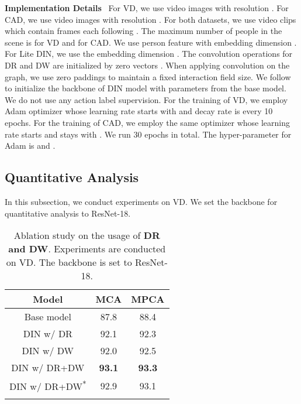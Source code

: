\documentclass[10pt,twocolumn,letterpaper]{article}
\begin{document}
\textbf{Implementation Details} \  For VD, we use video images with resolution . For CAD, we use video images with resolution . For both datasets, we use video clips which contain  frames each following \cite{wu2019learning,yan2020higcin,qi2018stagnet,hu2020prl}. The maximum number of people in the scene is  for VD and  for CAD. We use person feature with embedding dimension . For Lite DIN, we use the embedding dimension . The convolution operations for DR and DW are initialized by zero vectors \cite{dai2017dcnv1}. When applying convolution on the graph, we use zero paddings to maintain a fixed interaction field size. We follow \cite{wu2019learning} to initialize the backbone of DIN model with parameters from the base model. We do not use any action label supervision. For the training of VD, we employ Adam optimizer whose learning rate starts with  and decay rate is  every 10 epochs. For the training of CAD, we employ the same optimizer whose learning rate starts and stays with . We run 30 epochs in total. The hyper-parameter for Adam is  and . 



\subsection{Quantitative Analysis} \label{quantitative_analysis} 
In this subsection, we conduct experiments on VD. We set the backbone for quantitative analysis to ResNet-18.



\begin{table}[t]
\small
  \centering
    \begin{tabular}{c|cc}
    \Xhline{1.0pt}
    Model & MCA & MPCA \\
    \hline\hline
    Base model & 87.8  & 88.4  \\
    DIN w/ DR & 92.1  & 92.3  \\
    DIN w/ DW & 92.0  & 92.5  \\
    DIN w/ DR+DW & \textbf{93.1}  & \textbf{93.3}  \\
    DIN w/ DR+DW\textsuperscript{*} & 92.9  & 93.1  \\
    \Xhline{1.0pt}
    \end{tabular}\vspace{0.2cm}
  \caption{Ablation study on the usage of \textbf{DR and DW}. Experiments are conducted on VD. The backbone is set to ResNet-18.}
  \label{ablation_DR_DW}\end{table}
\end{document}
